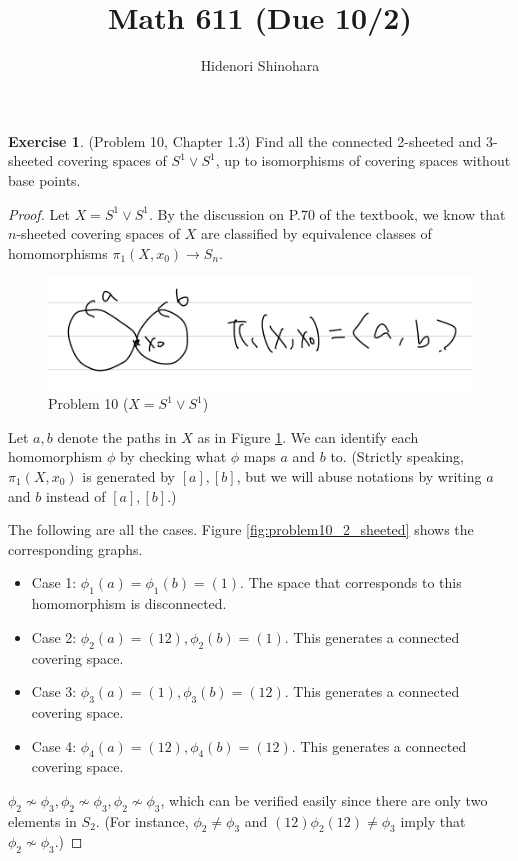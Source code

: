 \documentclass[12pt, psamsfonts]{amsart}
\theoremstyle{definition}
\newtheorem*{exer}{Exercise}
\theoremstyle{remark}
\numberwithin{equation}{section}
\begin{document}
\title{Math 611 (Due 10/2)}
\author{Hidenori Shinohara}
\maketitle

\begin{exer}{(Problem 10, Chapter 1.3)}
  Find all the connected 2-sheeted and 3-sheeted covering spaces of $S^1 \vee S^1$, up to isomorphisms of covering spaces without base points.
\end{exer}

\begin{proof}
  Let $X = S^1 \vee S^1$.
  By the discussion on P.70 of the textbook, we know that $n$-sheeted covering spaces of $X$ are classified by equivalence classes of homomorphisms $\pi_1(X, x_0) \rightarrow S_n$.
  \begin{figure}
    \includegraphics[width=.5\linewidth]{problem10_s1.jpeg}
    \caption{Problem 10 ($X = S^1 \vee S^1$)}
    \label{fig:problem10}
  \end{figure}
  Let $a, b$ denote the paths in $X$ as in Figure \ref{fig:problem10}.
  We can identify each homomorphism $\phi$ by checking what $\phi$ maps $a$ and $b$ to.
  (Strictly speaking, $\pi_1(X, x_0)$ is generated by $[a], [b]$, but we will abuse notations by writing $a$ and $b$ instead of $[a], [b]$.)


  The following are all the cases.
  Figure \ref{fig:problem10_2_sheeted} shows the corresponding graphs.
  \begin{itemize}
    \item
      Case 1: $\phi_1(a) = \phi_1(b) = (1)$.
      The space that corresponds to this homomorphism is disconnected.
    \item
      Case 2: $\phi_2(a) = (12), \phi_2(b) = (1)$.
      This generates a connected covering space.
    \item
      Case 3: $\phi_3(a) = (1), \phi_3(b) = (12)$.
      This generates a connected covering space.
    \item
      Case 4: $\phi_4(a) = (12), \phi_4(b) = (12)$.
      This generates a connected covering space.
  \end{itemize}

  $\phi_2 \not\sim \phi_3, \phi_2 \not\sim \phi_3, \phi_2 \not\sim \phi_3$, which can be verified easily since there are only two elements in $S_2$.
  (For instance, $\phi_2 \ne \phi_3$ and $(12)\phi_2(12) \ne \phi_3$ imply that $\phi_2 \not\sim \phi_3$.)


\end{proof}
\end{document}
